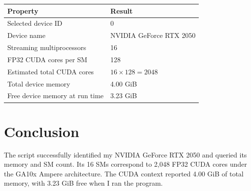 \documentclass[12pt,a4paper]{article}
\begin{document}
\begin{center}
\begin{tabular}{ll}
\hline
Property & Result \\
\hline
Selected device ID & 0 \\
Device name & NVIDIA GeForce RTX 2050 \\
Streaming multiprocessors & 16 \\
FP32 CUDA cores per SM & 128 \\
Estimated total CUDA cores & \(16\times128=2048\) \\
Total device memory & 4.00 GiB \\
Free device memory at run time & 3.23 GiB \\
\hline
\end{tabular}
\end{center}

\section{Conclusion}
The script successfully identified my NVIDIA GeForce RTX 2050 and queried its memory and SM count. Its 16 SMs correspond to 2,048 FP32 CUDA cores under the GA10x Ampere architecture. The CUDA context reported 4.00 GiB of total memory, with 3.23 GiB free when I ran the program.
\end{document}
